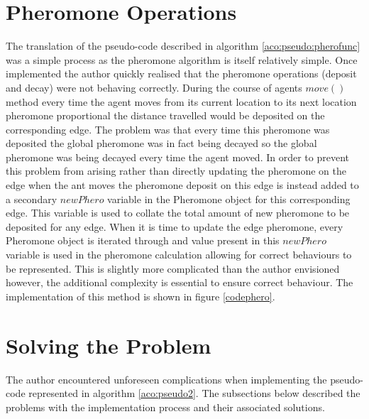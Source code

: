 \section{Pheromone Operations}
The translation of the pseudo-code described in algorithm \ref{aco:pseudo:pherofunc} was a simple process as the pheromone algorithm is itself relatively simple. Once implemented the author quickly realised that the pheromone operations (deposit and decay) were not behaving correctly. During the course of agents $move()$ method every time the agent moves from its current location to its next location pheromone proportional the distance travelled would be deposited on the corresponding edge. The problem was that every time this pheromone was deposited the global pheromone was in fact being decayed so the global pheromone was being decayed every time the agent moved. In order to prevent this problem from arising rather than directly updating the pheromone on the edge when the ant moves the pheromone deposit on this edge is instead added to a secondary $newPhero$ variable in the Pheromone object for this corresponding edge. This variable is used to collate the total amount of new pheromone to be deposited for any edge. When it is time to update the edge pheromone, every Pheromone object is iterated through and value present in this $newPhero$ variable is used in the pheromone calculation allowing for correct behaviours to be represented. This is slightly more complicated than the author envisioned however, the additional complexity is essential to ensure correct behaviour. The implementation of this method is shown in figure \ref{codephero}.

\section{Solving the Problem}

The author encountered unforeseen complications when implementing the pseudo-code represented in algorithm \ref{aco:pseudo2}. The subsections below described the problems with the implementation process and their associated solutions.

